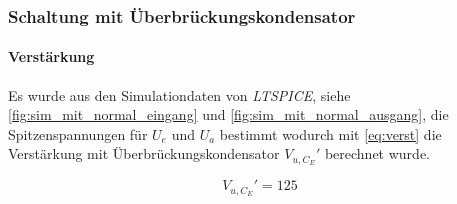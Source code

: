 \documentclass[12pt,english,ngerman]{scrartcl}
\begin{document}

\subsubsection{Schaltung mit Überbrückungskondensator}


\paragraph{Verstärkung}

Es wurde aus den Simulationdaten von \textit{LTSPICE}, siehe
\autoref{fig:sim_mit_normal_eingang} und \autoref{fig:sim_mit_normal_ausgang},
die Spitzenspannungen für $U_e$ und $U_a$ bestimmt wodurch mit
\autoref{eq:verst} die Verstärkung mit Überbrückungskondensator $V_{u,C_{E}}'$
berechnet wurde.

\begin{equation}
  V_{u,C_{E}}' = 125
  \label{eq:sim_verst_mit}
\end{equation}





\end{document}
